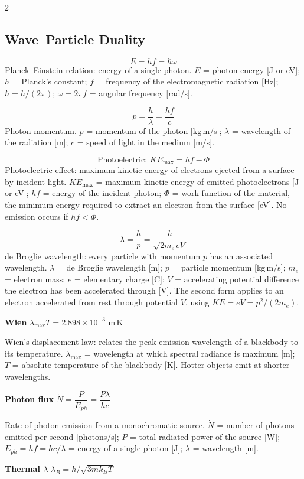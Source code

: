 \documentclass[9pt]{extarticle}
\newcommand{\eqlabel}[1]{\textbf{\scriptsize #1}\;}
\newcommand{\desc}[1]{{\small\color{desc}#1}}
\begin{document}
\begin{multicols}{2}
\subsection{Wave--Particle Duality}
\[E = hf = \hbar\omega\]
\desc{Planck--Einstein relation: energy of a single photon. $E$ = photon energy [J or eV]; $h$ = Planck's constant; $f$ = frequency of the electromagnetic radiation [Hz]; $\hbar = h/(2\pi)$; $\omega = 2\pi f$ = angular frequency [rad/s].}

\[p = \frac{h}{\lambda} = \frac{hf}{c}\]
\desc{Photon momentum. $p$ = momentum of the photon [kg\,m/s]; $\lambda$ = wavelength of the radiation [m]; $c$ = speed of light in the medium [m/s].}

\[\text{Photoelectric: } KE_{\max} = hf - \Phi\]
\desc{Photoelectric effect: maximum kinetic energy of electrons ejected from a surface by incident light. $KE_{\max}$ = maximum kinetic energy of emitted photoelectrons [J or eV]; $hf$ = energy of the incident photon; $\Phi$ = work function of the material, the minimum energy required to extract an electron from the surface [eV]. No emission occurs if $hf < \Phi$.}

\[\lambda = \frac{h}{p} = \frac{h}{\sqrt{2m_e\,eV}}\]
\desc{de Broglie wavelength: every particle with momentum $p$ has an associated wavelength. $\lambda$ = de Broglie wavelength [m]; $p$ = particle momentum [kg\,m/s]; $m_e$ = electron mass; $e$ = elementary charge [C]; $V$ = accelerating potential difference the electron has been accelerated through [V]. The second form applies to an electron accelerated from rest through potential $V$, using $KE = eV = p^2/(2m_e)$.}

\eqlabel{Wien} $\lambda_{\max}T = 2.898\times10^{-3}$ m\,K

\desc{Wien's displacement law: relates the peak emission wavelength of a blackbody to its temperature. $\lambda_{\max}$ = wavelength at which spectral radiance is maximum [m]; $T$ = absolute temperature of the blackbody [K]. Hotter objects emit at shorter wavelengths.}

\eqlabel{Photon flux} $\dot{N} = \dfrac{P}{E_{ph}} = \dfrac{P\lambda}{hc}$

\desc{Rate of photon emission from a monochromatic source. $\dot{N}$ = number of photons emitted per second [photons/s]; $P$ = total radiated power of the source [W]; $E_{ph} = hf = hc/\lambda$ = energy of a single photon [J]; $\lambda$ = wavelength [m].}

\eqlabel{Thermal $\lambda$} $\lambda_B = h/\sqrt{3mk_BT}$


\end{multicols}
\end{document}
